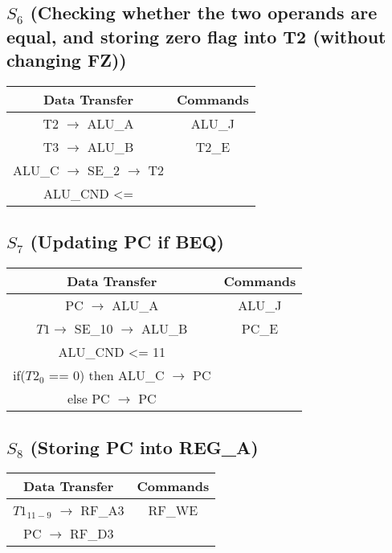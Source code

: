 \documentclass[]{article}
\begin{document}
        \subsection*{$S_6$ (Checking whether the two operands are equal, and storing zero flag into T2 (without changing FZ))} %
        \begin{center}
            \begin{tabular}{|c|c|}
                \hline
                Data Transfer & Commands \\
                \hline
                T2 $\to$ ALU\_A & ALU\_J\\
                T3 $\to$ ALU\_B & T2\_E\\
                ALU\_C $\to$ SE\_2 $\to$ T2 & \\
                ALU\_CND <=  & \\ %
                \hline
            \end{tabular}
        \end{center}
        \subsection*{$S_7$ (Updating PC if BEQ)} %
        \begin{center}
            \begin{tabular}{|c|c|}
                \hline
                Data Transfer & Commands \\
                \hline
                PC $\to$ ALU\_A & ALU\_J\\
                $T1 \to$ SE\_10 $\to$ ALU\_B & PC\_E\\
                ALU\_CND <= 11 & \\
                if($T2_0$ == 0) then ALU\_C $\to$ PC & \\
                else PC $\to$ PC & \\
                \hline
            \end{tabular}
        \end{center}
        \subsection*{$S_8$ (Storing PC into REG\_A)} %
        \begin{center}
            \begin{tabular}{|c|c|}
                \hline
                Data Transfer & Commands \\
                \hline
                $T1_{11-9}$ $\to$ RF\_A3 & RF\_WE\\
                PC $\to$ RF\_D3 & \\
                \hline
            \end{tabular}
        \end{center}
\end{document}
